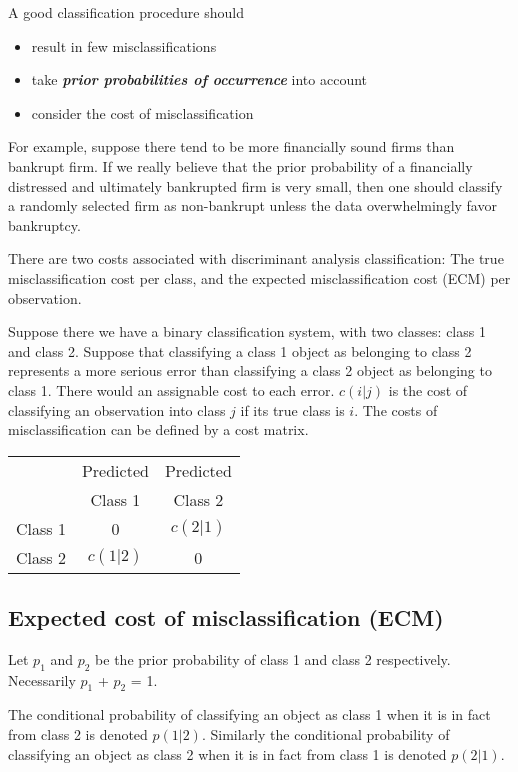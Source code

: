 \documentclass[]{report}
\begin{document}
A good classification procedure should
 \begin{itemize}
 \item result in few misclassifications
 \item take \textbf{\textit{prior probabilities of occurrence}} into account
 \item consider the cost of misclassification
 \end{itemize}
 
For example, suppose there tend to be more financially sound firms than bankrupt
firm. If we really believe that the prior probability of a financially
distressed and ultimately bankrupted firm is very small, then one should
classify a randomly selected firm as non-bankrupt unless the data
overwhelmingly favor bankruptcy.



There are two costs associated with discriminant analysis classification: The true misclassification cost per class, and the expected misclassification cost (ECM) per observation.

Suppose there we have a binary classification system, with two classes: class 1 and class 2.
Suppose that classifying a class 1 object as belonging to class 2 represents a more serious error than classifying a class 2 object as belonging to class 1. There would an assignable cost to each error.
$c(i|j)$ is the cost of classifying an observation into class $j$ if its true class is $i$.
The costs of misclassification can be defined by a cost matrix.

\begin{tabular}{|c|c|c|}
  \hline
  & Predicted & Predicted \\
   & Class 1 & Class 2 \\  \hline
  Class 1 & 0 & $c(2|1)$  \\
  Class 2 & $c(1|2)$ & 0 \\
  \hline
\end{tabular}




\subsection{Expected cost of misclassification (ECM)}
Let $p_1$ and $p_2$ be the prior probability of class 1 and class 2 respectively.
Necessarily $p_1$ + $p_2$ = 1.

The conditional probability of classifying an object as class 1 when it is in fact from
class 2 is denoted $p(1|2)$.
Similarly the conditional probability of classifying an object as class 2 when it is in
fact from class 1 is denoted $p(2|1)$.
\end{document}
